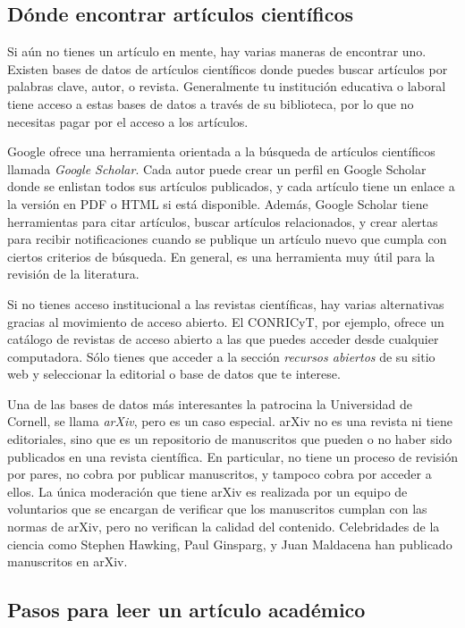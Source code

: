 \subsection*{Dónde encontrar artículos científicos}
Si aún no tienes un artículo en mente, hay varias maneras de encontrar uno.
Existen bases de datos de artículos científicos donde puedes buscar artículos por palabras clave, autor, o revista.
Generalmente tu institución educativa o laboral tiene acceso a estas bases de datos a través de su biblioteca, por lo que no necesitas pagar por el acceso a los artículos.

Google ofrece una herramienta orientada a la búsqueda de artículos científicos llamada \emph{Google Scholar}.
Cada autor puede crear un perfil en Google Scholar donde se enlistan todos sus artículos publicados, y cada artículo tiene un enlace a la versión en PDF o HTML si está disponible.
Además, Google Scholar tiene herramientas para citar artículos, buscar artículos relacionados, y crear alertas para recibir notificaciones cuando se publique un artículo nuevo que cumpla con ciertos criterios de búsqueda.
En general, es una herramienta muy útil para la revisión de la literatura.

Si no tienes acceso institucional a las revistas científicas, hay varias alternativas gracias al movimiento de acceso abierto.
El CONRICyT, por ejemplo, ofrece un catálogo de revistas de acceso abierto a las que puedes acceder desde cualquier computadora.
Sólo tienes que acceder a la sección \emph{recursos abiertos} de su sitio web y seleccionar la editorial o base de datos que te interese.

Una de las bases de datos más interesantes la patrocina la Universidad de Cornell, se llama \emph{arXiv}, pero es un caso especial. arXiv no es una revista ni tiene editoriales, sino que  es un repositorio de manuscritos que pueden o no haber sido publicados en una revista científica.
En particular, no tiene un proceso de revisión por pares, no cobra por publicar manuscritos, y tampoco cobra por acceder a ellos.
La única moderación que tiene arXiv es realizada por un equipo de voluntarios que se encargan de verificar que los manuscritos cumplan con las normas de arXiv, pero no verifican la calidad del contenido.
Celebridades de la ciencia como Stephen Hawking, Paul Ginsparg, y Juan Maldacena han publicado manuscritos en arXiv.

\subsection*{Pasos para leer un artículo académico}

